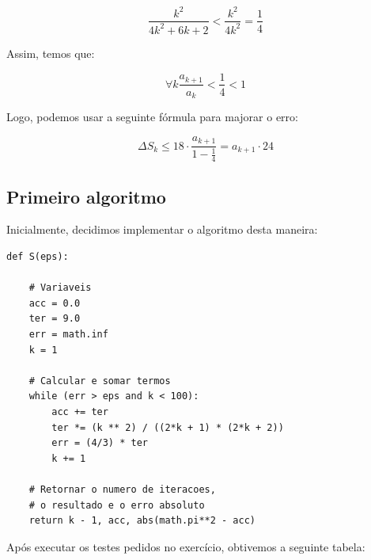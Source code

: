 \documentclass{article}
\begin{document}
\begin{equation}
    \frac{k^2}{4k^2 + 6k + 2} < \frac{k^2}{4k^2} = \frac{1}{4}
\end{equation}
\bigskip

\noindent
Assim, temos que:

\begin{equation}
    \forall k \frac{a_{k+1}}{a_k} < \frac{1}{4} < 1
\end{equation}
\bigskip

\noindent
Logo, podemos usar a seguinte fórmula para majorar o erro:
\medskip

\begin{equation}
    \Delta S_k \leq 18 \cdot \frac{a_{k+1}}{1-\frac{1}{4}} = a_{k+1} \cdot 24
\end{equation}
\pagebreak

\subsection{Primeiro algoritmo}

Inicialmente, decidimos implementar o algoritmo desta maneira:

\begin{center}
\begin{minipage}{0.8\linewidth}
\begin{lstlisting}[style=pythoncode]
def S(eps):

    # Variaveis
    acc = 0.0
    ter = 9.0
    err = math.inf
    k = 1

    # Calcular e somar termos
    while (err > eps and k < 100):
        acc += ter
        ter *= (k ** 2) / ((2*k + 1) * (2*k + 2))
        err = (4/3) * ter
        k += 1
        
    # Retornar o numero de iteracoes,
    # o resultado e o erro absoluto
    return k - 1, acc, abs(math.pi**2 - acc)
\end{lstlisting}
\end{minipage}
\end{center}

\noindent
Após executar os testes pedidos no exercício, obtivemos a seguinte tabela:
\end{document}
